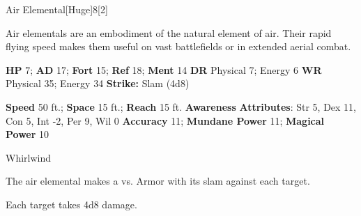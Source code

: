   \begin{monsection}{Air Elemental}[Huge]{8}[2]
    \vspace{-1em}\vspace{-1em}
    \vspace{0em}

    
    Air elementals are an embodiment of the natural element of air.
    Their rapid flying speed makes them useful on vast battlefields or in extended aerial combat.
  

    \begin{spellcontent}
      \begin{spelltargetinginfo}
        \pari \textbf{HP} 7;
          \textbf{AD} 17;
          \textbf{Fort} 15;
          \textbf{Ref} 18;
          \textbf{Ment} 14
        \pari \textbf{DR} Physical 7; Energy 6
        \pari \textbf{WR} Physical 35; Energy 34
        \pari \textbf{Strike:}
            Slam  (4d8)
      \end{spelltargetinginfo}
    \end{spellcontent}
    \begin{monsterfooter}
      \pari \textbf{Speed} 50 ft.;
        \textbf{Space} 15 ft.;
        \textbf{Reach} 15 ft.
      \pari \textbf{Awareness} 
      \pari \textbf{Attributes}:
        Str 5, Dex 11,
        Con 5, Int -2,
        Per 9, Wil 0
      \pari \textbf{Accuracy} 11;
        \textbf{Mundane Power} 11;
      \textbf{Magical Power} 10
    \end{monsterfooter}
  \end{monsection}
  \begin{freeability}{Whirlwind}
      
      The air elemental makes a 
         vs. Armor
        with its slam against each target.
    
    \hit Each target takes 4d8  damage.
    \end{freeability}
  
